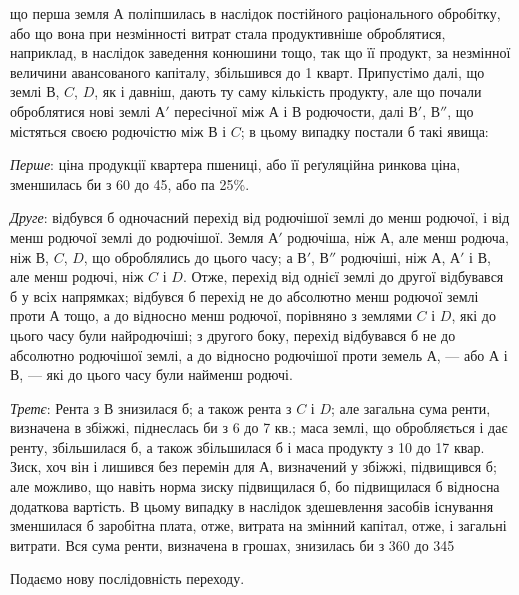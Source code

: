 \parcont{}  %
що перша земля $А$ поліпшилась в наслідок постійного раціонального обробітку,
або що вона при незмінності витрат стала продуктивніше оброблятися,
наприклад, в наслідок заведення конюшини тощо, так що її продукт, за незмінної
величини авансованого капіталу, збільшився до 1 кварт. Припустімо
далі, що землі $В$, $C$, $D$, як і давніш, дають ту саму кількість продукту, але що
почали оброблятися нові землі $А'$ пересічної між $А$ і $В$ родючости, далі $В'$, $В''$, що
містяться своєю родючістю між $В$ і $C$; в цьому випадку постали б такі явища:

\emph{Перше}: ціна продукції квартера пшениці, або її реґуляційна ринкова
ціна, зменшилась би з 60 до 45, або па 25\%.

\emph{Друге}: відбувся б одночасний перехід від родючішої землі до менш
родючої, і від менш родючої землі до родючішої. Земля $А'$ родючіша, ніж $А$, але
менш родюча, ніж $В$, $C$, $D$, що оброблялись до цього часу; а $В'$, $В''$ родючіші, ніж
$А$, $А'$ і $В$, але менш родючі, ніж $C$ і $D$. Отже, перехід від однієї землі до другої
відбувався б у всіх напрямках; відбувся б перехід не до абсолютно
менш родючої землі проти $А$ тощо, а до відносно менш родючої, порівняно
з землями $C$ і $D$, які до цього часу були найродючіші; з другого боку, перехід
відбувався б не до абсолютно родючішої землі, а до відносно родючішої проти
земель $А$, — або $А$ і $В$, — які до цього часу були найменш родючі.

\emph{Третє}: Рента з $В$ знизилася б; а також рента з $C$ і $D$; але загальна
сума ренти, визначена в збіжжі, піднеслась би з 6 до 7 кв.; маса землі, що
обробляється і дає ренту, збільшилася б, а також збільшилася б і маса продукту
з 10 до 17 квар. Зиск, хоч він і лишився без перемін для $А$, визначений у
збіжжі, підвищився б; але можливо, що навіть норма зиску підвищилася б, бо
підвищилася б відносна додаткова вартість. В цьому випадку в наслідок здешевлення
засобів існування зменшилася б заробітна плата, отже, витрата на змінний капітал,
отже, і загальні витрати. Вся сума ренти, визначена в грошах, знизилась би з 360 до 345

Подаємо нову послідовність переходу.

